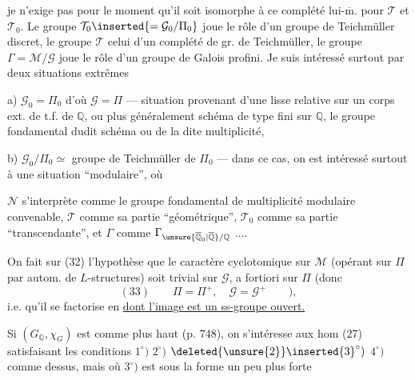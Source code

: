 je n'exige pas pour le moment qu'il soit isomorphe à ce complété lui-$\overline{\mathrm m}$.   pour $\mathcal{T}$ et $\mathcal{T}_0$. Le groupe $\mathcal{T}_0\inserted{=\mathcal{G}_0/\Pi_0}$ joue le rôle d'un groupe de Teichmüller  discret, le groupe $\mathcal{T}$ celui d'un complété de gr. de Teichmüller, le groupe $\Gamma=\mathcal{M}/\mathcal{G}$ joue le rôle d'un groupe de Galois profini.  Je suis intéressé surtout par deux situations extrêmes

a) $\mathcal{G}_0=\Pi_0$ d'où $\mathcal{G}=\Pi$ --- situation provenant d'une  lisse relative sur un corps  ext. de t.f. de $\mathbb{Q}$, ou plus généralement  schéma   de type fini sur $\mathbb{Q}$,   le groupe fondamental dudit  schéma ou de la dite multiplicité,

b) $\mathcal{G}_0/\Pi_0\simeq$ groupe de Teichmüller de $\Pi_0$  --- dans ce cas, on est intéressé surtout à une situation ``modulaire'', où


$\mathcal{N}$ s'interprète comme le groupe fondamental de  multiplicité modulaire convenable, $\mathcal{T}$ comme sa partie ``géométrique'', $\mathcal{T}_0$ comme sa partie ``transcendante'', et $\Gamma$ comme $\Gamma_{\unsure{\overline{\mathbb{Q}}_0|\overline{\mathbb{Q}}}/\mathbb{Q}}$ ....

On fait sur (32) l'hypothèse que le caractère cyclotomique sur $\mathcal{M}$ (opérant sur $\Pi$ par autom. de $L$-structures) soit trivial sur $\mathcal{G}$, a fortiori sur $\Pi$ (donc
\[
(33)\qquad \Pi=\Pi^{+},\quad \mathcal{G}=\mathcal{G}^{+}\qquad ),
\]
i.e. qu'il se factorise en
\uline{dont l'image est un ss-groupe ouvert.}

Si $(G_{\mathbb{Q}},\chi_G)$ est comme plus haut (p. 748), on s'intéresse aux hom (27)
satisfaisant les conditions $1^{\circ})$ $2^{\circ})$ $\deleted{\unsure{2}}\inserted{3}^{\circ})$ $4^{\circ})$ comme dessus, mais où $3^{\circ})$ est  sous la forme un peu plus forte

